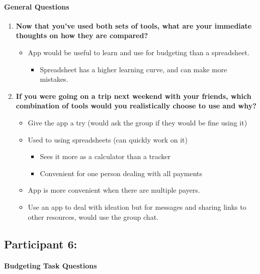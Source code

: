 \documentclass[12pt,a4paper]{article}
\begin{document}
\paragraph{General Questions}

\begin{enumerate}
    \item \textbf{Now that you've used both sets of tools, what are your immediate thoughts on how they are compared?}
    
    \begin{itemize}
        \item App would be useful to learn and use for budgeting than a spreadsheet.
        \begin{itemize}
            \item Spreadsheet has a higher learning curve, and can make more mistakes.
        \end{itemize}
    \end{itemize}
    
    \item \textbf{If you were going on a trip next weekend with your friends, which combination of tools would you realistically choose to use and why?}
    
    \begin{itemize}
        \item Give the app a try (would ask the group if they would be fine using it)
        \item Used to using spreadsheets (can quickly work on it)
        \begin{itemize}
            \item Sees it more as a calculator than a tracker
            \item Convenient for one person dealing with all payments
        \end{itemize}
        \item App is more convenient when there are multiple payers.
        \item Use an app to deal with ideation but for messages and sharing links to other resources, would use the group chat.
    \end{itemize}
\end{enumerate}

\subsection{Participant 6:}
\paragraph{Budgeting Task Questions}
\end{document}
